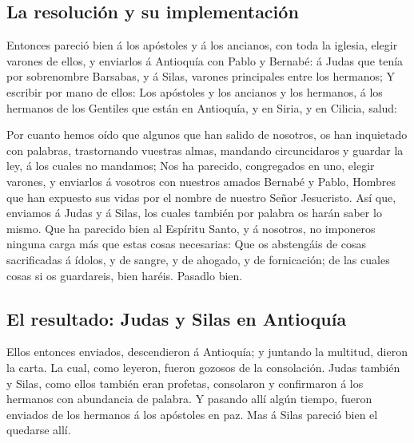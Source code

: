 \hypertarget{la-resoluciuxf3n-y-su-implementaciuxf3n}{%
\subsection{La resolución y su
implementación}\label{la-resoluciuxf3n-y-su-implementaciuxf3n}}

 Entonces pareció bien á los apóstoles y á los ancianos,
con toda la iglesia, elegir varones de ellos, y enviarlos á Antioquía
con Pablo y Bernabé: á Judas que tenía por sobrenombre Barsabas, y á
Silas, varones principales entre los hermanos;  Y
escribir por mano de ellos: Los apóstoles y los ancianos y los hermanos,
á los hermanos de los Gentiles que están en Antioquía, y en Siria, y en
Cilicia, salud:

 Por cuanto hemos oído que algunos que han salido de
nosotros, os han inquietado con palabras, trastornando vuestras almas,
mandando circuncidaros y guardar la ley, á los cuales no mandamos;
 Nos ha parecido, congregados en uno, elegir varones, y
enviarlos á vosotros con nuestros amados Bernabé y Pablo,
 Hombres que han expuesto sus vidas por el nombre de
nuestro Señor Jesucristo.  Así que, enviamos á Judas y á
Silas, los cuales también por palabra os harán saber lo mismo.
 Que ha parecido bien al Espíritu Santo, y á nosotros, no
imponeros ninguna carga más que estas cosas necesarias: 
Que os abstengáis de cosas sacrificadas á ídolos, y de sangre, y de
ahogado, y de fornicación; de las cuales cosas si os guardareis, bien
haréis. Pasadlo bien.

\hypertarget{el-resultado-judas-y-silas-en-antioquuxeda}{%
\subsection{El resultado: Judas y Silas en
Antioquía}\label{el-resultado-judas-y-silas-en-antioquuxeda}}

 Ellos entonces enviados, descendieron á Antioquía; y
juntando la multitud, dieron la carta.  La cual, como
leyeron, fueron gozosos de la consolación.  Judas también
y Silas, como ellos también eran profetas, consolaron y confirmaron á
los hermanos con abundancia de palabra.  Y pasando allí
algún tiempo, fueron enviados de los hermanos á los apóstoles en paz.
 Mas á Silas pareció bien el quedarse allí.


